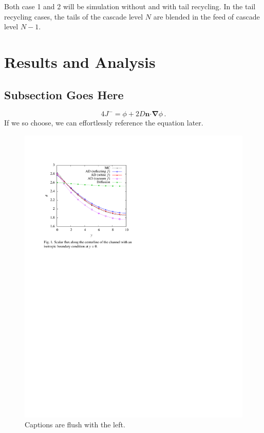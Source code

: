 \documentclass{anstrans}
\renewcommand{\vec}[1]{\bm{#1}} %
\newcommand{\vd}{\bm{\cdot}} %
\newcommand{\grad}{\vec{\nabla}} %
\begin{document}
Both case 1 and 2 will be simulation without and with tail recycling. In the
tail recycling cases, the tails of the cascade level $N$ are blended in the feed
of cascade level $N-1$.

\section{Results and Analysis}

\subsection{Subsection Goes Here}
\begin{equation} \label{eq:marshak}
  4 J^- = \phi + 2 D \vec{n} \vd \grad \phi \,.
\end{equation}
If we so choose, we can effortlessly reference the equation later.

\begin{figure}[ht] %
  \centering
  \includegraphics{example_figure}
  \caption{Captions are flush with the left.}
  \label{fig:voltage}
\end{figure}
\end{document}
